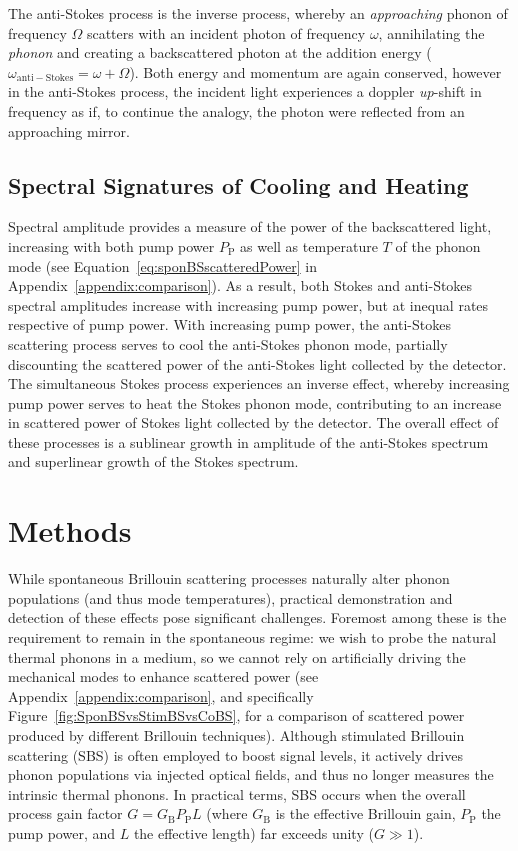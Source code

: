 The anti-Stokes process is the inverse process, whereby an \textit{approaching} phonon of frequency \(\Omega\) scatters with an incident photon of frequency \(\omega\), annihilating the \textit{phonon} and creating a backscattered photon at the addition energy (\(\omega_{\mathrm{anti-Stokes}} = \omega + \Omega\)). Both energy and momentum are again conserved, however in the anti-Stokes process, the incident light experiences a doppler \textit{up}-shift in frequency as if, to continue the analogy, the photon were reflected from an approaching mirror.

\subsection{Spectral Signatures of Cooling and Heating}
\label{Cooling:subsec:SpectralSignaturesofCoolingandHeating}

Spectral amplitude provides a measure of the power of the backscattered light, increasing with both pump power \(P_{\mathrm{P}}\) as well as temperature \(T\) of the phonon mode (see Equation~\ref{eq:sponBSscatteredPower} in Appendix~\ref{appendix:comparison}). As a result, both Stokes and anti-Stokes spectral amplitudes increase with increasing pump power, but at inequal rates respective of pump power. With increasing pump power, the anti-Stokes scattering process serves to cool the anti-Stokes phonon mode, partially discounting the scattered power of the anti-Stokes light collected by the detector. The simultaneous Stokes process experiences an inverse effect, whereby increasing pump power serves to heat the Stokes phonon mode, contributing to an increase in scattered power of Stokes light collected by the detector. The overall effect of these processes is a sublinear growth in amplitude of the anti-Stokes spectrum and superlinear growth of the Stokes spectrum.

\section{Methods}
\label{Cooling:sec:Methods}

While spontaneous Brillouin scattering processes naturally alter phonon populations (and thus mode temperatures), practical demonstration and detection of these effects pose significant challenges. Foremost among these is the requirement to remain in the spontaneous regime: we wish to probe the natural thermal phonons in a medium, so we cannot rely on artificially driving the mechanical modes to enhance scattered power (see Appendix~\ref{appendix:comparison}, and specifically Figure~\ref{fig:SponBSvsStimBSvsCoBS}, for a comparison of scattered power produced by different Brillouin techniques). Although stimulated Brillouin scattering (SBS) is often employed to boost signal levels, it actively drives phonon populations via injected optical fields, and thus no longer measures the intrinsic thermal phonons. In practical terms, SBS occurs when the overall process gain factor \(G = G_{\mathrm{B}}P_{\mathrm{P}}L\) (where \(G_{\mathrm{B}}\) is the effective Brillouin gain, \(P_{\mathrm{P}}\) the pump power, and \(L\) the effective length) far exceeds unity (\(G \gg 1\)).

